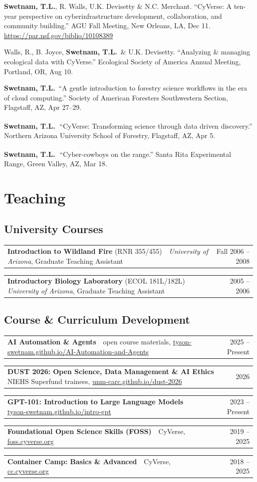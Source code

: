 \documentclass[11pt,letterpaper]{article}
\makeatletter
\newcommand{\dated}[2]{%
  \begin{tabularx}{\linewidth}{@{}X r@{}}
    #1 & {\small #2}
  \end{tabularx}\par\vspace{2pt}}
\newcommand{\me}{\textbf{Swetnam, T.L.}}
\newcommand{\inv}{\textsuperscript{\color{cherry}\,\ding{72}}}
\newcommand{\yearhead}[1]{\par\vspace{5pt}{\small\bfseries\color{cherry}#1}\par\vspace{2pt}}
\newenvironment{hanglist}
  {\begin{list}{}{\setlength{\leftmargin}{1.4em}\setlength{\itemindent}{-1.4em}%
     \setlength{\itemsep}{3pt}\setlength{\parsep}{0pt}\setlength{\topsep}{1pt}}}
  {\end{list}}
\makeatother
\begin{document}
\yearhead{2017}
\begin{hanglist}
\item \me, R. Walls, U.K. Devisetty \& N.C. Merchant. ``CyVerse: A ten-year perspective on cyberinfrastructure development, collaboration, and community building.'' AGU Fall Meeting, New Orleans, LA, Dec 11. \url{https://par.nsf.gov/biblio/10108389}
\item Walls, R., B. Joyce, \me\ \& U.K. Devisetty. ``Analyzing \& managing ecological data with CyVerse.'' Ecological Society of America Annual Meeting, Portland, OR, Aug 10.
\item \me\ ``A gentle introduction to forestry science workflows in the era of cloud computing.'' Society of American Foresters Southwestern Section, Flagstaff, AZ, Apr 27--29.
\item \me\inv\ ``CyVerse: Transforming science through data driven discovery.'' Northern Arizona University School of Forestry, Flagstaff, AZ, Apr 5.
\item \me\inv\ ``Cyber-cowboys on the range.'' Santa Rita Experimental Range, Green Valley, AZ, Mar 18.
\end{hanglist}

\section{Teaching}

\subsection{University Courses}
\dated{\textbf{Introduction to Wildland Fire} (RNR 355/455) \,\textendash\, \textit{University of Arizona}, Graduate Teaching Assistant}{Fall 2006 -- 2008}
\dated{\textbf{Introductory Biology Laboratory} (ECOL 181L/182L) \,\textendash\, \textit{University of Arizona}, Graduate Teaching Assistant}{2005 -- 2006}

\subsection{Course \& Curriculum Development}
\dated{\textbf{AI Automation \& Agents} \,\textendash\, open course materials, \href{https://tyson-swetnam.github.io/AI-Automation-and-Agents/}{tyson-swetnam.github.io/AI-Automation-and-Agents}}{2025 -- Present}
\dated{\textbf{DUST 2026: Open Science, Data Management \& AI Ethics} \,\textendash\, NIEHS Superfund trainees, \href{https://unm-carc.github.io/dust-2026/}{unm-carc.github.io/dust-2026}}{2026}
\dated{\textbf{GPT-101: Introduction to Large Language Models} \,\textendash\, \href{https://tyson-swetnam.github.io/intro-gpt}{tyson-swetnam.github.io/intro-gpt}}{2023 -- Present}
\dated{\textbf{Foundational Open Science Skills (FOSS)} \,\textendash\, CyVerse, \href{https://foss.cyverse.org}{foss.cyverse.org}}{2019 -- 2025}
\dated{\textbf{Container Camp: Basics \& Advanced} \,\textendash\, CyVerse, \href{https://cc.cyverse.org}{cc.cyverse.org}}{2018 -- 2025}
\end{document}
